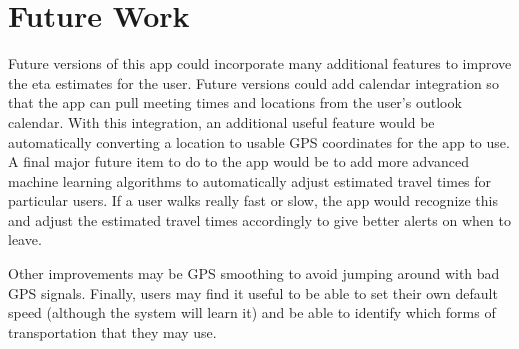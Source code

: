 \section{Future Work}
Future versions of this app could incorporate many additional features to improve the eta estimates for the user. Future versions could add calendar integration so that the app can pull meeting times and locations from the user's outlook calendar. With this integration, an additional useful feature would be automatically converting a location to usable GPS coordinates for the app to use. A final major future item to do to the app would be to add more advanced machine learning algorithms to automatically adjust estimated travel times for particular users. If a user walks really fast or slow, the app would recognize this and adjust the estimated travel times accordingly to give better alerts on when to leave.

Other improvements may be GPS smoothing to avoid jumping around with bad GPS signals. Finally, users may find it useful to be able to set their own default speed (although the system will learn it) and be able to identify which forms of transportation that they may use. 

